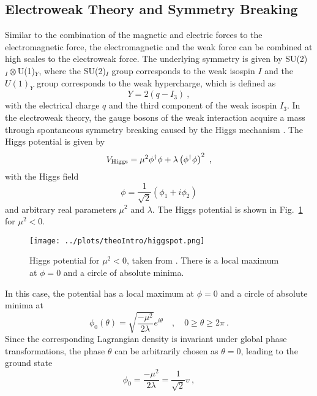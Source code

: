 \subsection{Electroweak Theory and Symmetry Breaking}
\label{subsec:theo:EWK}
Similar to the combination of the magnetic and electric forces to the electromagnetic force, the electromagnetic and the weak force can be combined at high scales to the electroweak force. The underlying symmetry is given by SU(2)$_I\otimes$U(1)$_Y$, where the SU(2)$_I$ group corresponds to the weak isospin $I$ and the $U(1)_Y$ group corresponds to the weak hypercharge, which is defined as
\begin{equation}
Y=2(q-I_3) ~,
\end{equation}
with the electrical charge $q$ and the third component of the weak isospin $I_3$. In the electroweak theory, the gauge bosons of the weak interaction acquire a mass through spontaneous symmetry breaking caused by the Higgs mechanism \cite{higgsmech}. The Higgs potential is given by
\begin{equation}
V_{\rm Higgs} = \mu^2 \phi^\dagger\phi + \lambda \left(\phi^\dagger\phi\right)^2 ~,
\end{equation}
with the Higgs field
\begin{equation}
\phi=\frac{1}{\sqrt{2}}(\phi_1+i\phi_2)
\end{equation}
and arbitrary real parameters $\mu^2$ and $\lambda$. The Higgs potential is shown in Fig.~\ref{fig:theo:higgspot} for $\mu^2<0$.
\begin{figure}
	\centering
	\texttt{[image: ../plots/theoIntro/higgspot.png]}
	\caption[Higgs potential for $\mu^2<0$]{Higgs potential for $\mu^2<0$, taken from \cite{higgspot}. There is a local maximum at $\phi=0$ and a circle of absolute minima.}
	\label{fig:theo:higgspot}
\end{figure}
In this case, the potential has a local maximum at $\phi=0$ and a circle of absolute minima at
\begin{equation}
\phi_0(\theta) = \sqrt{\frac{-\mu^2}{2\lambda}}e^{i\theta} \quad , \quad 0\geq \theta \geq 2\pi ~.
\end{equation}
Since the corresponding Lagrangian density is invariant under global phase transformations, the phase $\theta$ can be arbitrarily chosen as $\theta=0$, leading to the ground state
\begin{equation}
\phi_0 = \frac{-\mu^2}{2\lambda}=\frac{1}{\sqrt{2}}v ~, \label{eq:theo:higgsexp}
\end{equation}
